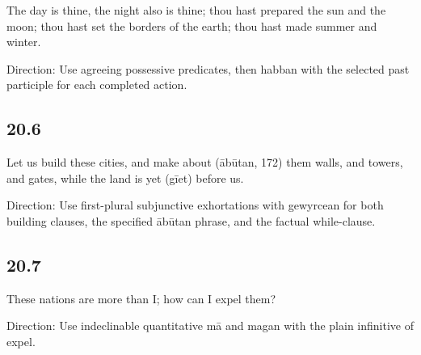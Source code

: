 \par\begin{minipage}{\linewidth}\raggedright
The day is thine, the night also is thine; thou hast prepared the sun and the moon; thou hast set the borders of the earth; thou hast made summer and winter.

Direction: Use agreeing possessive predicates, then habban with the selected past participle for each completed action.

\end{minipage}\par\addvspace{4pt}

\subsection*{20.6}

\par\begin{minipage}{\linewidth}\raggedright
Let us build these cities, and make about (ābūtan, 172) them walls, and towers, and gates, while the land is yet (gīet) before us.

Direction: Use first-plural subjunctive exhortations with gewyrcean for both building clauses, the specified ābūtan phrase, and the factual while-clause.

\end{minipage}\par\addvspace{4pt}

\subsection*{20.7}

\par\begin{minipage}{\linewidth}\raggedright
These nations are more than I; how can I expel them?

Direction: Use indeclinable quantitative mā and magan with the plain infinitive of expel.

\end{minipage}\par\addvspace{4pt}

